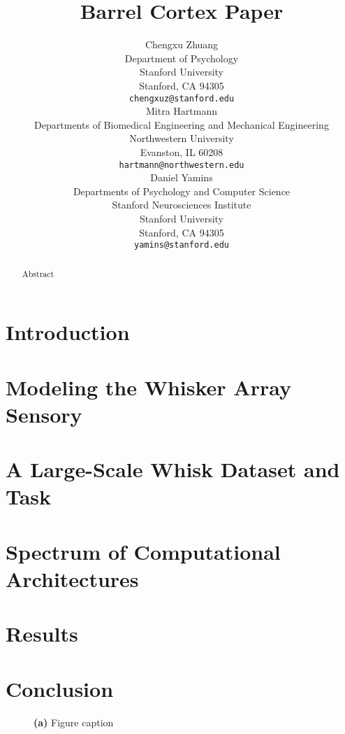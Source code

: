 \documentclass{article} %
\title{Barrel Cortex Paper}
\author{
Chengxu Zhuang\\
Department of Psychology\\
Stanford University\\
Stanford, CA 94305 \\
\texttt{chengxuz@stanford.edu} \\
\And
Mitra Hartmann \\
Departments of Biomedical Engineering and Mechanical Engineering \\
Northwestern University \\
Evanston, IL  60208\\
\texttt{hartmann@northwestern.edu} \\
\And
Daniel Yamins \\
Departments of Psychology and Computer Science \\
Stanford Neurosciences Institute \\
Stanford University \\
Stanford, CA 94305 \\
\texttt{yamins@stanford.edu} \\
}
\begin{document}
\maketitle

\begin{abstract}
Abstract
\end{abstract}


\section{Introduction} %

\section{Modeling the Whisker Array Sensory} %

\section{A Large-Scale Whisk Dataset and Task} %

\section{Spectrum of Computational Architectures} %

\section{Results} %

\section{Conclusion}  %

\begin{figure}[H]
\centering
\vspace{-2mm}
\caption{\textbf{(a)}  Figure caption   \label{figname}}
\end{figure}


{\small
}

\end{document}
